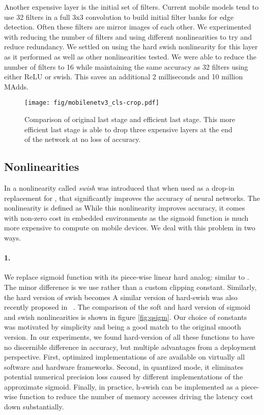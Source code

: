\documentclass[10pt,twocolumn,letterpaper]{article}
\begin{document}
Another expensive layer is the initial set of filters. Current mobile models tend to use 32 filters in a full 3x3 convolution to build initial filter banks for edge detection. Often these filters are mirror images of each other. We experimented with reducing the number of filters and using different nonlinearities to try and reduce redundancy. We settled on using the hard swish nonlinearity for this layer as it performed as well as other nonlinearities tested. We were able to reduce the number of filters to 16 while maintaining the same accuracy as 32 filters using either ReLU or swish. This saves an additional 2 milliseconds and 10 million MAdds.

\begin{figure}[!t]
    \centering
    \texttt{[image: fig/mobilenetv3\_cls-crop.pdf]}
    \caption{Comparison of original last stage and efficient last stage. This more  efficient last stage is able to drop three expensive layers at the end of the network at no loss of accuracy.}
    \label{fig:mobilenetv3_last_stage}
\end{figure}





\subsection{Nonlinearities}
\label{section:nonlinearities}
\newcommand\relus{\operatorname{ReLU6}}
\newcommand\relu{\operatorname{ReLU}}

In \cite{swish, silu, gelu} a nonlinearity called {\it swish} was introduced that when used as a drop-in replacement for , that significantly improves the accuracy of neural networks.  The nonlinearity is defined as 
While this nonlinearity improves accuracy, it comes with non-zero cost in embedded environments as the sigmoid function is much more expensive  to compute on mobile devices.
We deal with this problem in two ways. 

\paragraph{1.} We replace sigmoid function with its piece-wise linear hard analog: 
 similar to \cite{binaryconnect,spse1992curves}. The minor difference is we use  rather than a custom clipping constant.  Similarly, the hard version of swish becomes 
A similar version of hard-swish was also recently proposed in~ \cite{hard-swish}. The comparison of the soft and hard version of sigmoid and swish nonlinearities is shown in figure \ref{fig:qsigm}. Our choice of constants was motivated by simplicity and
being a good match to the original smooth version. 
In our experiments, we found hard-version of all these functions to have no discernible difference in accuracy, but multiple advantages from a deployment perspective.  First, optimized implementations of  are available  on virtually all software and hardware frameworks.
Second, in quantized mode, it eliminates potential numerical precision loss caused by different implementations of the approximate sigmoid.  Finally, in practice, h-swish can be implemented as a piece-wise function to reduce the number of memory accesses driving the latency cost down substantially. 
\end{document}
